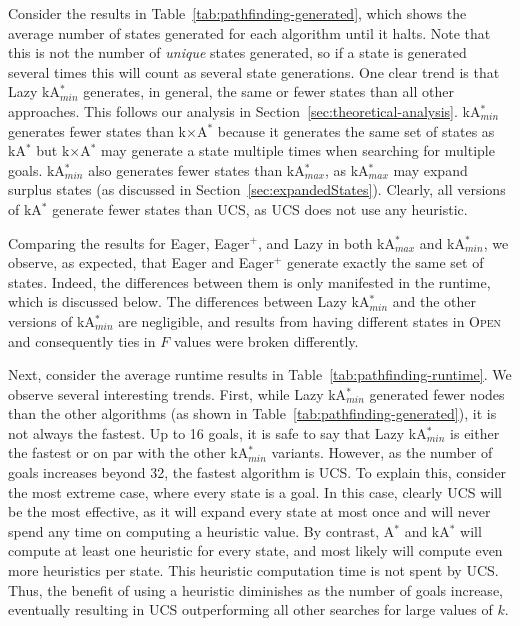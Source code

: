 \documentclass{aicom2e}
\newcommand{\astar}{A$^*$}
\newcommand{\kastar}{kA$^*$}
\newcommand{\kastarmin}{kA$^*_{min}$}
\newcommand{\kastarmax}{kA$^*_{max}$}
\newcommand{\kxastar}{k$\times$A$^*$}
\newcommand{\open}{\textsc{Open}}
\begin{document}


Consider the results in Table~\ref{tab:pathfinding-generated}, which shows the
average number of states generated for each algorithm until it halts. Note that
this is not the number of {\em unique} states generated, so if a state is
generated several times this will
count as several state generations. 
One clear trend is that Lazy \kastarmin{}
generates, in general, the same or fewer states than all other approaches. This
follows our analysis in Section~\ref{sec:theoretical-analysis}. \kastarmin{}
generates fewer states than \kxastar{} because it generates the same set of
states as \kastar{} but \kxastar{} may generate a state multiple times when
searching for multiple goals. \kastarmin{} also generates fewer states than
\kastarmax{}, as \kastarmax{} may expand surplus states (as discussed in
Section~\ref{sec:expandedStates}). Clearly, all versions of \kastar{} generate
fewer states than UCS, as UCS does not use any heuristic.

Comparing the results for Eager, Eager$^+$, and Lazy in both \kastarmax{} and
\kastarmin{}, we observe, as expected, that Eager and Eager$^+$ generate
exactly the same set of states. Indeed, the differences between them is only
manifested in the runtime, which is discussed below. The differences between
Lazy \kastarmin{} and the other versions of \kastarmin{} are negligible, and
results from having different states in \open{} and consequently ties in $F$
values were broken differently.


Next, consider the average runtime results in
Table~\ref{tab:pathfinding-runtime}. We observe several interesting trends.
First, while Lazy \kastarmin{}
generated fewer nodes than the other algorithms (as shown in Table~\ref{tab:pathfinding-generated}), it is not always the fastest.
Up to 16 goals, it is safe to say that Lazy \kastarmin{} is either the fastest
or on par with the other \kastarmin{} variants. However, as the number of goals
increases beyond 32, the fastest algorithm is UCS. To explain this, consider
the most extreme case, where every state is a goal. In this case, clearly UCS
will be the most effective, as it will expand every state at most once and will
never spend any time on computing a heuristic value. By contrast, \astar{} and
\kastar{} will compute at least one heuristic for every state, and most likely
will compute even more heuristics per state. This heuristic computation time is
not spent by UCS. Thus, the benefit of using a heuristic diminishes as the
number of goals increase, eventually resulting in UCS outperforming all other
searches for large values of $k$.
\end{document}
